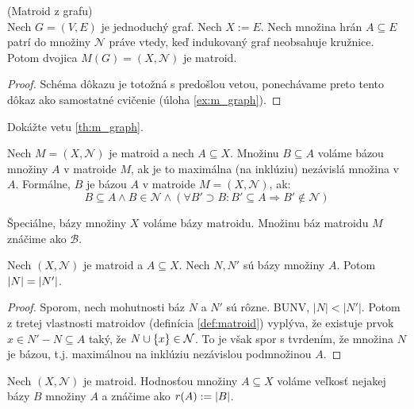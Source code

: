 \begin{theorem}{(Matroid z grafu)}\\
\label{th:m_graph}
Nech $G = (V, E)$ je jednoduchý graf. Nech $X := E$. Nech množina hrán $A \subseteq E$ patrí do množiny $\mathcal{N}$ práve vtedy, keď
indukovaný graf neobsahuje kružnice. Potom dvojica $M(G) = (X, \mathcal{N})$ je matroid.
\end{theorem}
\begin{toreview}
\begin{proof}
Schéma dôkazu je totožná s predošlou vetou, ponechávame preto tento dôkaz ako samostatné cvičenie (úloha \ref{ex:m_graph}).
\end{proof}

\begin{exercise}
\label{ex:m_graph}
Dokážte vetu \ref{th:m_graph}.
\end{exercise}

\end{toreview}


\begin{definition}
Nech $M = (X, \mathcal{N})$ je matroid a nech $A \subseteq X$. Množinu $B \subseteq A$ voláme bázou množiny $A$ v matroide $M$, ak 
je to maximálna (na inklúziu) nezávislá množina v $A$. Formálne, $B$ je bázou $A$ v matroide $M=(X, \mathcal{N})$, ak:
$$B \subseteq A \wedge B \in \mathcal{N} \wedge \left( \forall B' \supset B: B' \subseteq A \Longrightarrow B' \not\in\mathcal{N} \right)$$

Špeciálne, bázy množiny $X$ voláme bázy matroidu. Množinu báz matroidu $M$ znáčime ako $\mathcal{B}$.
\end{definition}

\begin{theorem}
Nech $(X, \mathcal{N})$ je matroid a $A \subseteq X$. Nech $N, N'$ sú bázy množiny $A$. Potom $\left|N\right| = \left|N'\right|$.
\end{theorem}
\begin{toreview}
\begin{proof}
Sporom, nech mohutnosti báz $N$ a $N'$ sú rôzne.
BUNV, $|N| < |N'|$.
Potom z tretej vlastnosti matroidov (definícia \ref{def:matroid}) vyplýva, že existuje prvok $x \in N' - N \subseteq A$ taký, že $N \cup \left\{x\right\} \in \mathcal{N}$.
To je však spor s tvrdením, že množina $N$ je bázou, t.j. maximálnou na inklúziu nezávislou podmnožinou $A$.
\end{proof}
\end{toreview}

\begin{definition}
Nech $(X, \mathcal{N})$ je matroid. Hodnosťou množiny $A \subseteq X$ voláme veľkosť nejakej bázy $B$ množiny $A$ a znáčime ako $r(A) := \left|B\right|$.
\end{definition}

